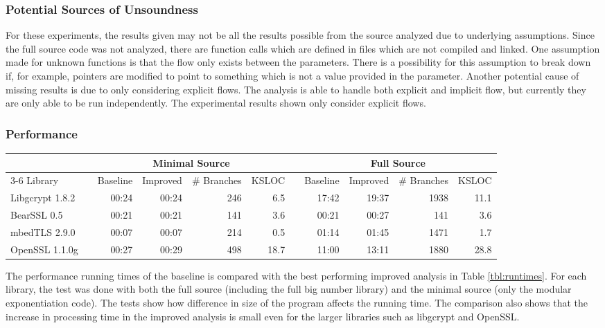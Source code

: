\subsubsection{Potential Sources of Unsoundness}
For these experiments, the results given may not be all the results possible
from the source analyzed due to underlying assumptions. Since the full source
code was not analyzed, there are function calls which are defined in files which
are not compiled and linked. One assumption made for unknown functions is that
the flow only exists between the parameters. There is a possibility for this
assumption to break down if, for example, pointers are modified to point to
something which is not a value provided in the parameter. Another potential
cause of missing results is due to only considering explicit flows. The analysis
is able to handle both explicit and implicit flow, but currently they are only
able to be run independently. The experimental results shown only consider
explicit flows.

\subsubsection{Performance}

\begin{table*}[!t]
  \centering
  \begin{tabular}{@{}lcrrrrcrrrr@{}}
    \toprule
     & & \multicolumn{4}{c}{Minimal Source} & &  \multicolumn{4}{c}{Full Source} \\
    \cmidrule{3-6} \cmidrule{8-11}
    Library&& Baseline & Improved & \# Branches & KSLOC && Baseline & Improved & \# Branches & KSLOC\\
    \midrule
    Libgcrypt 1.8.2 && 00:24 & 00:24 & 246 & 6.5 &&  17:42 & 19:37 & 1938 & 11.1\\
    BearSSL 0.5 && 00:21 & 00:21 & 141  & 3.6 && 00:21 & 00:27  & 141 & 3.6\\
    mbedTLS 2.9.0 && 00:07 & 00:07& 214 & 0.5 && 01:14 & 01:45  & 1471 & 1.7\\
    OpenSSL 1.1.0g && 00:27 & 00:29& 498 & 18.7 && 11:00 & 13:11 & 1880 & 28.8\\
    \bottomrule
  \end{tabular}
\caption{Baseline and Improved Analysis Run Time (mm:ss)}
\label{tbl:runtimes}
\end{table*}

The performance running times of the baseline is compared with the best
performing improved analysis in Table \ref{tbl:runtimes}. For each library, the
test was done with both the full source (including the full big number library)
and the minimal source (only the modular exponentiation code). The
tests show how difference in size of the program affects the running time. The comparison
also shows that the increase in processing time in the improved analysis is
small even for the larger libraries such as libgcrypt and OpenSSL.


